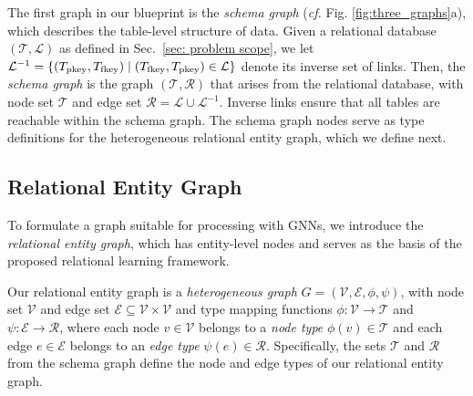 The first graph in our blueprint is the \emph{schema graph} (\emph{cf.} Fig. \ref{fig:three_graphs}a), which describes the table-level structure of data.
Given a relational database $(\mathcal{T}, \mathcal{L})$ as defined in Sec.~\ref{sec: problem scope}, we let \mbox{$\mathcal L^{-1} = \{(T_{\rm pkey}, T_{\rm fkey}) \mid (T_{\rm fkey}, T_{\rm pkey}) \in \mathcal{L}\}$} denote its inverse set of links.
Then, the \emph{schema graph} is the graph $(\mathcal{T}, \mathcal{R})$ that arises from the relational database, with node set $\mathcal{T}$ and edge set $\mathcal{R} = \mathcal L \cup \mathcal L^{-1}$.
Inverse links ensure that all tables are reachable within the schema graph.
The schema graph nodes serve as type definitions for the heterogeneous relational entity graph, which we define next. 


\subsection{Relational Entity Graph}
\label{sec:formal_rl_graph}

To formulate a graph suitable for processing with GNNs, we introduce the \emph{relational entity graph}, which has entity-level nodes and serves as the basis of the proposed relational learning framework.

Our relational entity graph is a \emph{heterogeneous graph}  $G=(\mathcal{V}, \mathcal{E}, \phi, \psi)$, with node set $\mathcal{V}$ and edge set $\mathcal{E} \subseteq \mathcal V \times \mathcal V$ and type mapping functions $\phi: \mathcal{V} \rightarrow \mathcal{T}$ and $\psi: \mathcal{E} \rightarrow \mathcal{R}$, where each node $v \in \mathcal{V}$ belongs to a \emph{node type} $\phi(v) \in \mathcal{T}$ and each edge $e \in \mathcal E$ belongs to an \emph{edge type} $\psi(e) \in \mathcal{R}$.
Specifically, the sets $\mathcal{T}$ and $\mathcal{R}$ from the schema graph define the node and edge types of our relational entity graph.

